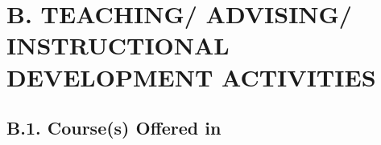 \documentclass[12pt]{article}
\begin{document}
\section*{B. TEACHING/ ADVISING/ INSTRUCTIONAL DEVELOPMENT ACTIVITIES}


\subsection*{B.1. Course(s) Offered in \the\year}




\end{document}
